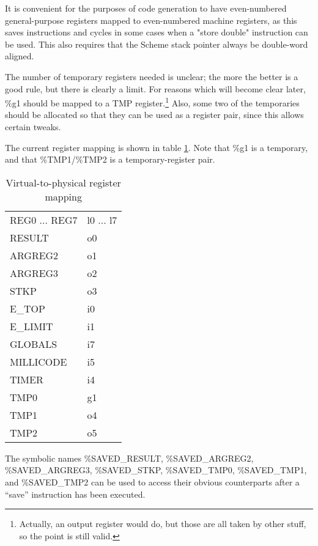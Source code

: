 It is convenient for the purposes of code generation to have
even-numbered general-purpose registers mapped to even-numbered
machine registers, as this saves instructions and cycles in some cases
when a "store double" instruction can be used. This also requires that
the Scheme stack pointer always be double-word aligned.

The number of temporary registers needed is unclear; the more the better is
a good rule, but there is clearly a limit. For reasons which will become
clear later, \%g1 should be mapped to a TMP register.\footnote{Actually,
an output register would do, but those are all taken by other stuff, so
the point is still valid.} Also, some two of the
temporaries should be allocated so that they can be used as a register pair,
since this allows certain tweaks.

The current register mapping is shown in table \ref{mappings}.
Note that \%g1 is a temporary, and that \%TMP1/\%TMP2 is a temporary-register
pair.


\begin{table}[hbt]
\begin{center}
\begin{tabular}{|l|l|} \hline
   REG0 ... REG7 &  l0 ... l7  \\
   RESULT        &  o0 \\
   ARGREG2       &  o1 \\
   ARGREG3       &  o2 \\
   STKP          &  o3 \\
   E\_TOP        & i0 \\
   E\_LIMIT      & i1 \\
   GLOBALS       &  i7 \\
   MILLICODE     &  i5 \\
   TIMER         &  i4 \\
   TMP0          &  g1 \\
   TMP1          &  o4 \\
   TMP2          &  o5 \\ \hline
\end{tabular}
\end{center}
\caption{Virtual-to-physical register mapping}
\label{mappings}
\end{table}

The symbolic names \%SAVED\_RESULT, \%SAVED\_ARGREG2, \%SAVED\_ARGREG3,
\%SAVED\_STKP, \%SAVED\_TMP0, \%SAVED\_TMP1, and \%SAVED\_TMP2 can be 
used to access their obvious counterparts after a ``save'' instruction has
been executed.

